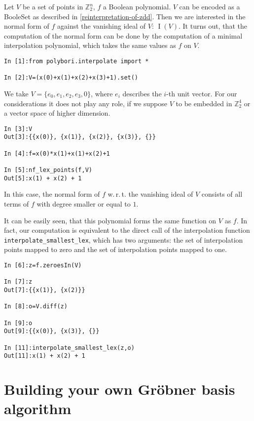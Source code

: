 \documentclass[]{article}
\newcommand{\Groebner}{Gr\"{o}bner\xspace}
\DeclareMathOperator{\I}{I}
\newcommand{\Ztwo}{\mathbb{Z}_2}
\newcounter{thm}
\begin{document}
Let $V$ be a set of points in $\Ztwo^n$, $f$ a Boolean polynomial. $V$ can be encoded as a BooleSet as described in \ref{reinterpretation-of-zdd}.
Then we are interested in the normal form of $f$ against the vanishing ideal of $V$: $\I(V)$.
It turns out, that the computation of the normal form can be done by the computation of a minimal interpolation polynomial, which takes the same values as $f$ on $V$.

\begin{verbatim}
In [1]:from polybori.interpolate import *

In [2]:V=(x(0)+x(1)+x(2)+x(3)+1).set()
\end{verbatim}

We take $V=\{e_0,e_1,e_2,e_3,0\}$, where $e_i$ describes the $i$-th unit vector. For our considerations it does not play any role, if we suppose $V$ to be embedded in $\Ztwo^4$ or a vector space of higher dimension.

\begin{verbatim}
In [3]:V
Out[3]:{{x(0)}, {x(1)}, {x(2)}, {x(3)}, {}}

In [4]:f=x(0)*x(1)+x(1)+x(2)+1

In [5]:nf_lex_points(f,V)
Out[5]:x(1) + x(2) + 1
\end{verbatim}

In this case, the normal form of $f$ w.\,r.\,t. the vanishing ideal of $V$ consists of all terms of $f$ with degree smaller or equal to $1$.

It can be easily seen, that this polynomial forms the same function on $V$ as $f$.
In fact, our computation is equivalent to the direct call of the interpolation function \verb|interpolate_smallest_lex|, which has two arguments: the set of interpolation points mapped to zero and the set of interpolation points mapped to one.

\begin{verbatim}
In [6]:z=f.zeroesIn(V)

In [7]:z
Out[7]:{{x(1)}, {x(2)}}

In [8]:o=V.diff(z)

In [9]:o
Out[9]:{{x(0)}, {x(3)}, {}}

In [11]:interpolate_smallest_lex(z,o)
Out[11]:x(1) + x(2) + 1
\end{verbatim}

\section{Building your own \Groebner basis algorithm}
\end{document}
